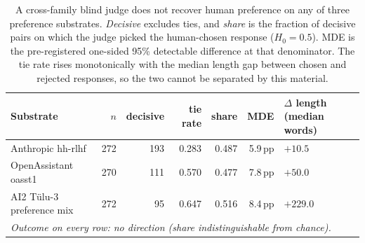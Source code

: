 \begin{table}[t]
\centering
\small
\caption{A cross-family blind judge does not recover human preference on any of three preference substrates. \emph{Decisive} excludes ties, and \emph{share} is the fraction of decisive pairs on which the judge picked the human-chosen response ($H_0=0.5$). MDE is the pre-registered one-sided 95\% detectable difference at that denominator. The tie rate rises monotonically with the median length gap between chosen and rejected responses, so the two cannot be separated by this material.}
\label{tab:blind-panel}
\begin{tabular}{lrrrrrl}
\toprule
Substrate & $n$ & decisive & tie rate & share & MDE & $\Delta$ length (median words) \\
\midrule
Anthropic hh-rlhf & 272 & 193 & 0.283 & 0.487 & 5.9\,pp & $+10.5$ \\
OpenAssistant oasst1 & 270 & 111 & 0.570 & 0.477 & 7.8\,pp & $+50.0$ \\
AI2 Tülu-3 preference mix & 272 & 95 & 0.647 & 0.516 & 8.4\,pp & $+229.0$ \\
\midrule
\multicolumn{7}{l}{\emph{Outcome on every row: no direction (share indistinguishable from chance).}} \\
\bottomrule
\end{tabular}
\end{table}
